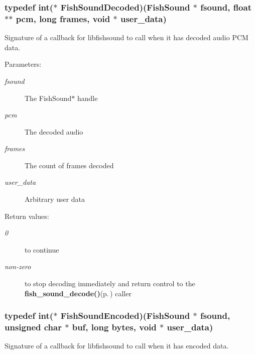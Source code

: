 \subsubsection{\setlength{\rightskip}{0pt plus 5cm}typedef int($\ast$ {\bf Fish\-Sound\-Decoded})({\bf Fish\-Sound} $\ast$ fsound, float $\ast$$\ast$ pcm, long frames, void $\ast$ user\_\-data)}\label{fishsound_8h_a1}


Signature of a callback for libfishsound to call when it has decoded audio PCM data. 

\begin{Desc}
\item[Parameters:]
\begin{description}
\item[{\em fsound}]The Fish\-Sound$\ast$ handle \item[{\em pcm}]The decoded audio \item[{\em frames}]The count of frames decoded \item[{\em user\_\-data}]Arbitrary user data \end{description}
\end{Desc}
\begin{Desc}
\item[Return values:]
\begin{description}
\item[{\em 0}]to continue \item[{\em non-zero}]to stop decoding immediately and return control to the {\bf fish\_\-sound\_\-decode()}{\rm (p.\,\pageref{fishsound_8h_a7})} caller \end{description}
\end{Desc}
\subsubsection{\setlength{\rightskip}{0pt plus 5cm}typedef int($\ast$ {\bf Fish\-Sound\-Encoded})({\bf Fish\-Sound} $\ast$ fsound, unsigned char $\ast$ buf, long bytes, void $\ast$ user\_\-data)}\label{fishsound_8h_a2}


Signature of a callback for libfishsound to call when it has encoded data. 

